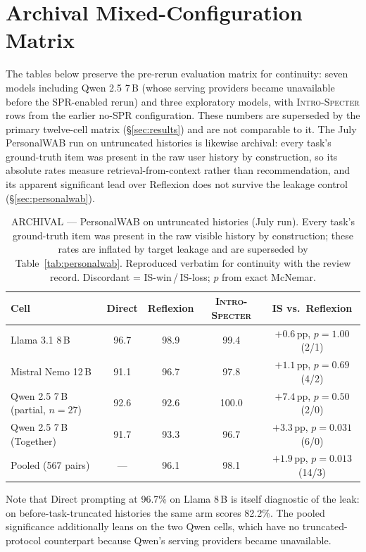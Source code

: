 \documentclass{article}
\newcommand{\method}{\textsc{Intro-Specter}\xspace}
\begin{document}
\appendix

\section{Archival Mixed-Configuration Matrix}\label{app:archival-matrix}

The tables below preserve the pre-rerun evaluation matrix for continuity: seven models including Qwen 2.5 7\,B (whose serving providers became unavailable before the SPR-enabled rerun) and three exploratory models, with \method rows from the earlier no-SPR configuration. These numbers are superseded by the primary twelve-cell matrix (\S\ref{sec:results}) and are not comparable to it. The July PersonalWAB run on untruncated histories is likewise archival: every task's ground-truth item was present in the raw user history by construction, so its absolute rates measure retrieval-from-context rather than recommendation, and its apparent significant lead over Reflexion does not survive the leakage control (\S\ref{sec:personalwab}).

\begin{table}[h]\centering\small
\caption{ARCHIVAL --- PersonalWAB on untruncated histories (July run). Every task's ground-truth item was present in the raw visible history by construction; these rates are inflated by target leakage and are superseded by Table~\ref{tab:personalwab}. Reproduced verbatim for continuity with the review record. Discordant = IS-win\,/\,IS-loss; $p$ from exact McNemar.}
\label{tab:personalwab-arch}
\begin{tabular}{lcccc}\toprule
Cell & Direct & Reflexion & \method & IS vs.\ Reflexion \\\midrule
Llama 3.1 8\,B      & 96.7 & 98.9 & 99.4  & $+0.6$\,pp, $p{=}1.00$ (2/1) \\
Mistral Nemo 12\,B  & 91.1 & 96.7 & 97.8  & $+1.1$\,pp, $p{=}0.69$ (4/2) \\
Qwen 2.5 7\,B (partial, $n{=}27$) & 92.6 & 92.6 & 100.0 & $+7.4$\,pp, $p{=}0.50$ (2/0) \\
Qwen 2.5 7\,B (Together) & 91.7 & 93.3 & 96.7 & $+3.3$\,pp, $p{=}0.031$ (6/0) \\\midrule
Pooled (567 pairs)  & ---  & 96.1 & 98.1  & $+1.9$\,pp, $p{=}0.013$ (14/3) \\
\bottomrule\end{tabular}\end{table}

Note that Direct prompting at 96.7\% on Llama 8\,B is itself diagnostic of the leak: on before-task-truncated histories the same arm scores 82.2\%. The pooled significance additionally leans on the two Qwen cells, which have no truncated-protocol counterpart because Qwen's serving providers became unavailable.
\end{document}
